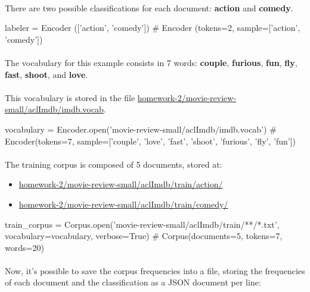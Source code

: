 \documentclass{article}
\begin{document}
\paragraph{} There are two possible classifications for each document: \textbf{action} and \textbf{comedy}.

\begin{python}
labeler = Encoder (['action', 'comedy'])
# Encoder (tokens=2, sample=['action', 'comedy'])
\end{python}

\paragraph{} The vocabulary for this example consists in 7 words: \textbf{couple}, \textbf{furious}, \textbf{fun}, \textbf{fly}, \textbf{fast}, \textbf{shoot}, and \textbf{love}.

\paragraph{} This vocabulary is stored in the file \url{homework-2/movie-review-small/aclImdb/imdb.vocab}\@.

\begin{python}
vocabulary = Encoder.open('movie-review-small/aclImdb/imdb.vocab')
# Encoder(tokens=7, sample=['couple', 'love', 'fast', 'shoot', 'furious', 'fly', 'fun'])
\end{python}

\paragraph{} The training corpus is composed of 5 documents, stored at:

\begin{itemize}
\item \url{homework-2/movie-review-small/aclImdb/train/action/}
\item \url{homework-2/movie-review-small/aclImdb/train/comedy/}
\end{itemize}

\begin{python}
train_corpus = Corpus.open('movie-review-small/aclImdb/train/**/*.txt', vocabulary=vocabulary, verbose=True)
# Corpus(documents=5, tokens=7, words=20)
\end{python}

\paragraph{} Now, it's possible to save the corpus frequencies into a file, storing the frequencies of each document and the classification as a JSON document per line:
\end{document}
